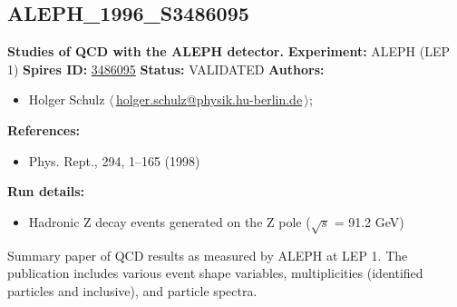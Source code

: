 \subsection{ALEPH\_1996\_S3486095}
\textbf{Studies of QCD with the ALEPH detector.}\newline
\textbf{Experiment:} ALEPH (LEP 1) \newline
\textbf{Spires ID:} \href{http://www.slac.stanford.edu/spires/find/hep/www?rawcmd=key+3486095}{3486095}\newline
\textbf{Status:} VALIDATED\newline
\textbf{Authors:}
\begin{itemize}
  \item Holger Schulz $\langle\,$\href{mailto:holger.schulz@physik.hu-berlin.de}{holger.schulz@physik.hu-berlin.de}$\,\rangle$;
\end{itemize}
\textbf{References:}
\begin{itemize}
  \item Phys. Rept., 294, 1--165 (1998)
\end{itemize}
\textbf{Run details:}
\begin{itemize}

  \item Hadronic Z decay events generated on the Z pole (\ensuremath{\sqrt{s}} = 91.2 GeV)\end{itemize}

\noindent Summary paper of QCD results as measured by ALEPH at LEP 1. The publication includes various event shape variables, multiplicities (identified particles and inclusive), and particle spectra.

\clearpage


\clearpage

